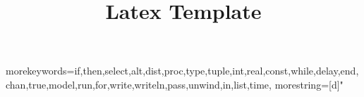\documentclass[10pt,a4paper]{article}
\title{Latex Template}
\begin{document}
\setlength{\headheight}{15.2pt}
\pagestyle{fancy}
\fancyhf{}
\renewcommand{\headrulewidth}{0pt}
\renewcommand{\footrulewidth}{0.4pt}

  {morekeywords={if,then,select,alt,dist,proc,type,tuple,int,real,const,while,delay,end,chan,true,model,run,for,write,writeln,pass,unwind,in,list,time},
   morestring=[d]"
  }













\end{document}
